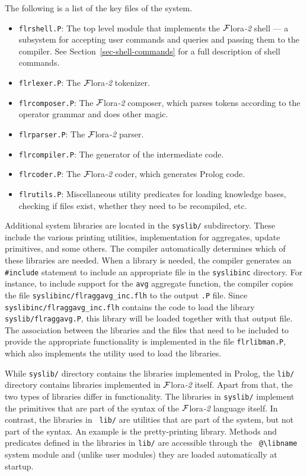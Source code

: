 \documentclass[11pt]{article}
\newcommand{\FLORA}{{\mbox{\sc ${\cal F}${lora}\rm\emph{-2}}}\xspace}
\newcommand{\FLSYSTEM}{\FLORA}
\newcommand{\bs}{\textbackslash}
\begin{document}
{The following is a list of the key files of the system.
\begin{itemize}
\item \texttt{flrshell.P}: The top level module that implements the
  \FLSYSTEM shell --- a subsystem for accepting user commands and queries and
  passing them to the compiler.  See Section~\ref{sec-shell-commands} for a
  full description of shell commands.
\item \texttt{flrlexer.P}: The \FLSYSTEM tokenizer.
\item \texttt{flrcomposer.P}: The \FLSYSTEM composer, which parses tokens
  according to the operator grammar and does other magic.
\item \texttt{flrparser.P}: The \FLSYSTEM parser.
\item \texttt{flrcompiler.P}: The generator of the intermediate code.
\item \texttt{flrcoder.P}: The \FLSYSTEM coder, which generates Prolog code.
\item \texttt{flrutils.P}: Miscellaneous utility predicates for loading
  knowledge bases, checking if files exist, whether they need to be recompiled,
  etc.
\end{itemize}
Additional system libraries are located in the {\tt syslib/} subdirectory.
These include the various printing utilities, implementation for
aggregates, update primitives, and some others. The compiler automatically
determines which of these libraries are needed. When a
library is needed, the compiler generates an {\tt \#include} statement to
include an appropriate file in the {\tt syslibinc} directory. For instance,
to include support for the {\tt avg} aggregate function, the compiler
copies the file {\tt syslibinc/flraggavg\_inc.flh} to the output {\tt .P}
file.  Since {\tt syslibinc/flraggavg\_inc.flh} contains the code to load
the library {\tt syslib/flraggavg.P}, this library will be loaded together
with that output file. The association between the libraries and the files
that need to be included to provide the appropriate functionality is
implemented in the file {\tt flrlibman.P}, which also implements the
utility used to load the libraries.

While {\tt syslib/} directory contains the libraries implemented in Prolog,
the {\tt lib/} directory contains libraries implemented in \FLSYSTEM itself.
Apart from that, the two types of libraries differ in functionality.  The
libraries in {\tt syslib/} implement the primitives that are part of the
syntax of the \FLSYSTEM language itself. In contrast, the libraries in {\tt
  lib/} are utilities that are part of the system, but not part of the
syntax. An example is the pretty-printing library.  Methods and predicates
defined in the libraries in {\tt lib/} are accessible through the {\tt
  @\bs{}libname} system module and (unlike user modules) they are loaded
automatically at startup.

}
\end{document}

